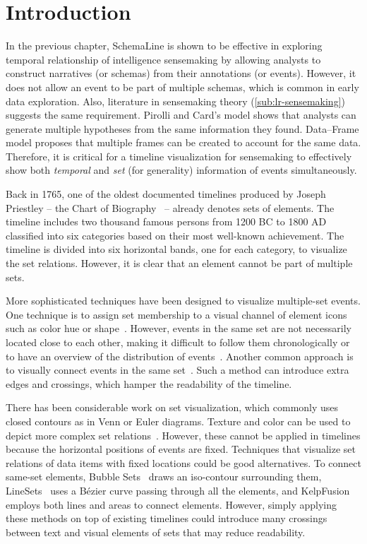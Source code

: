 \section{Introduction}
In the previous chapter, SchemaLine is shown to be effective in exploring temporal relationship of intelligence sensemaking by allowing analysts to construct narratives (or schemas) from their annotations (or events). However, it does not allow an event to be part of multiple schemas, which is common in early data exploration. Also, literature in sensemaking theory (\autoref{sub:lr-sensemaking})  suggests the same requirement. Pirolli and Card's model shows that analysts can generate multiple hypotheses from the same information they found. Data--Frame model proposes that multiple frames can be created to account for the same data. Therefore, it is critical for a timeline visualization for sensemaking to effectively show both \emph{temporal} and \emph{set} (for generality) information of events simultaneously.

Back in 1765, one of the oldest documented timelines produced by Joseph Priestley -- the Chart of Biography~\cite{Priestley1765} -- already denotes sets of elements. The timeline includes two thousand famous persons from 1200 BC to 1800 AD classified into six categories based on their most well-known achievement. The timeline is divided into six horizontal bands, one for each category, to visualize the set relations. However, it is clear that an element cannot be part of multiple sets. 

More sophisticated techniques have been designed to visualize multiple-set events. One technique is to assign set membership to a visual channel of element icons such as color hue or shape~\cite{TimeGlider2016}. However, events in the same set are not necessarily located close to each other, making it difficult to follow them chronologically or to have an overview of the distribution of events~\cite{SimileTimeline2009,TimeGlider2016}. Another common approach is to visually connect events in the same set~\cite{Kumar1998}. Such a method can introduce extra edges and crossings, which hamper the readability of the timeline. 

There has been considerable work on set visualization, which commonly uses closed contours as in Venn or Euler diagrams. Texture and color can be used to depict more complex set relations~\cite{Ware2013}. However, these cannot be applied in timelines because the horizontal positions of events are fixed. Techniques that visualize set relations of data items with fixed locations could be good alternatives. To connect same-set elements, Bubble Sets~\cite{Collins2009a} draws an iso-contour surrounding them, LineSets~\cite{Alper2011} uses a B\'{e}zier curve passing through all the elements, and KelpFusion~\cite{Meulemans2013} employs both lines and areas to connect elements. However, simply applying these methods on top of existing timelines could introduce many crossings between text and visual elements of sets that may reduce readability.

